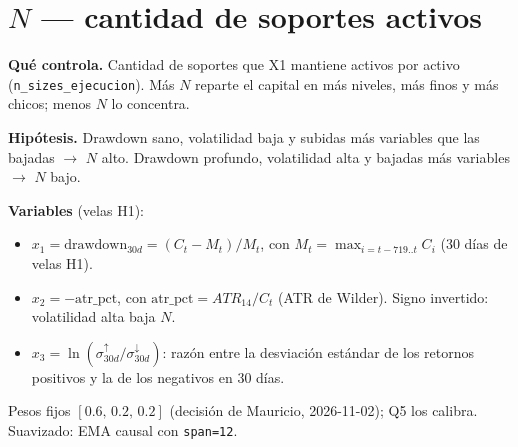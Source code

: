 \documentclass[11pt,a4paper]{article}
\newcommand{\code}[1]{\texttt{\small #1}}
\begin{document}
\section*{$N$ --- cantidad de soportes activos}

\textbf{Qué controla.} Cantidad de soportes que X1 mantiene activos por activo (\code{n\_sizes\_ejecucion}). Más $N$ reparte el capital en más niveles, más finos y más chicos; menos $N$ lo concentra.

\textbf{Hipótesis.} Drawdown sano, volatilidad baja y subidas más variables que las bajadas $\rightarrow$ $N$ alto. Drawdown profundo, volatilidad alta y bajadas más variables $\rightarrow$ $N$ bajo.

\textbf{Variables} (velas H1):
\begin{itemize}\setlength{\itemsep}{1pt}\setlength{\topsep}{1pt}
\item $x_1=\text{drawdown}_{30d}=(C_t-M_t)/M_t$, con $M_t=\max_{i=t-719..t}C_i$ (30 días de velas H1).
\item $x_2=-\text{atr\_pct}$, con $\text{atr\_pct}=ATR_{14}/C_t$ (ATR de Wilder). Signo invertido: volatilidad alta baja $N$.
\item $x_3=\ln(\sigma^{\uparrow}_{30d}/\sigma^{\downarrow}_{30d})$: razón entre la desviación estándar de los retornos positivos y la de los negativos en 30 días.
\end{itemize}
Pesos fijos $[0.6,\,0.2,\,0.2]$ (decisión de Mauricio, 2026-11-02); Q5 los calibra. Suavizado: EMA causal con \code{span=12}.
\end{document}
